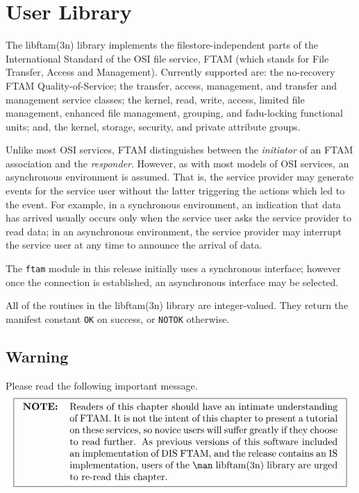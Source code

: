 
\chapter	{User Library}\label{libftam}
The \man libftam(3n) library implements the filestore-independent parts of
the International Standard of the OSI file service, FTAM
(which stands for File Transfer, Access and Management).
Currently supported are:
the no-recovery FTAM Quality-of-Service;
the transfer, access, management, and transfer and management service classes;
the kernel, read, write, access, limited file management,
enhanced file management, grouping, and fadu-locking functional units;
and, the kernel, storage, security, and private attribute groups.

Unlike most OSI services,
FTAM distinguishes between the {\em initiator\/} of an FTAM association and
the {\em responder}.
However,
as with most models of OSI services,
an asynchronous environment is assumed.
That is,
the service provider may generate events for the service user without the
latter triggering the actions which led to the event.
For example,
in a synchronous environment,
an indication that data has arrived usually occurs only when the service user
asks the service provider to read data;
in an asynchronous environment,
the service provider may interrupt the service user at any time to announce
the arrival of data.

The \verb"ftam" module in this release initially uses a synchronous interface;
however once the connection is established,
an asynchronous interface may be selected.

All of the routines in the \man libftam(3n) library are integer-valued.
They return the manifest constant \verb"OK" on success,
or \verb"NOTOK" otherwise.

\section	{Warning}\label{ftam:note}
Please read the following important message.
\[\fbox{\begin{tabular}{lp{0.8\textwidth}}
\bf NOTE:&	Readers of this chapter should have an intimate understanding
		of FTAM.
		It is not the intent of this
		chapter to present a tutorial on these services, so novice
		users will suffer greatly if they choose to read further.

		As previous versions of this software included an
		implementation of DIS FTAM, and the release contains an IS
		implementation, users of the \man libftam(3n) library
		are urged to re-read this chapter.
\end{tabular}}\]

